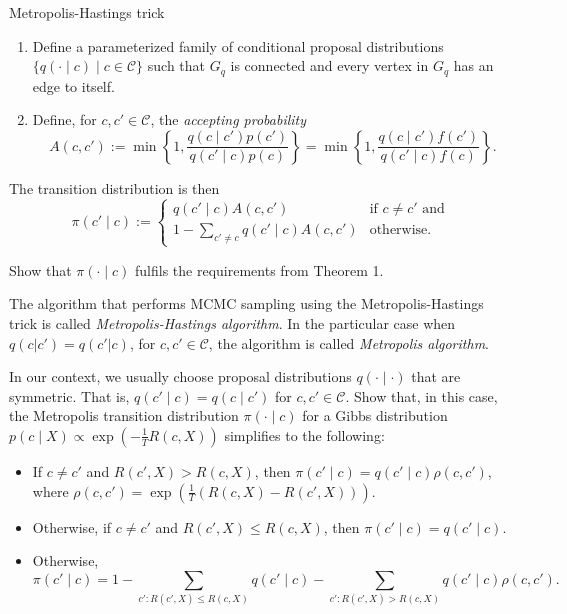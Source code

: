 \begin{definition}{Metropolis-Hastings trick}
\begin{enumerate}
\item Define a parameterized family of conditional proposal distributions
$\{q(\cdot \mid c) \mid c \in \mathcal{C}\}$ such that $G_q$ is connected and every vertex in $G_q$
has an edge to itself.
\item Define, for $c, c' \in \mathcal{C}$, the \emph{accepting probability}
%
\begin{equation}
A(c, c') := \min\left\{1, \frac{q(c \mid c')p(c')}{q(c' \mid c)p(c)}\right\} = \min\left\{1, \frac{q(c \mid c')f(c')}{q(c' \mid c)f(c)}\right\}.
\end{equation}
%
\end{enumerate}
%
The transition distribution is then
%
\begin{equation}
\pi(c' \mid c) := \begin{cases}
q(c' \mid c)A(c, c') & \text{if $c \neq c'$ and}\\
1 - \sum_{c' \neq c}q(c' \mid c)A(c, c') & \text{otherwise}.
\end{cases}
\end{equation}
%
\end{definition}

\begin{exercise}
Show that $\pi(\cdot \mid c)$ fulfils the requirements from Theorem 1.
\end{exercise}

\begin{definition}
The algorithm that performs MCMC sampling using the Metropolis-Hastings trick is called \emph{Metropolis-Hastings algorithm}. In the particular case when $q(c | c') = q(c' | c)$, for $c, c' \in \mathcal{C}$, the algorithm is called \emph{Metropolis algorithm}.
\end{definition}

\begin{exercise}
In our context, we usually choose proposal distributions $q(\cdot \mid \cdot)$
that are symmetric. That is, $q(c' \mid c) = q(c \mid c')$ for $c, c' \in \mathcal{C}$. Show that,
in this case, the Metropolis transition distribution $\pi(\cdot \mid c)$ for a
Gibbs distribution $p(c \mid X) \propto \exp\left(-\frac{1}{T}R(c, X)\right)$ simplifies to the following:

\begin{itemize}
\item If $c \neq c'$ and $R(c', X) > R(c, X)$, then $\pi(c' \mid c) = q(c' \mid c)\rho(c, c')$, where $\rho(c, c') = \exp\left(\frac{1}{T}\left(R(c, X) - R(c', X)\right)\right)$.
\item Otherwise, if $c \neq c'$ and $R(c', X) \leq R(c, X)$, then $\pi(c' \mid c) = q(c' \mid c)$.
\item Otherwise,
%
\begin{equation}
\pi(c' \mid c) = 1 - \sum_{c' : R(c', X) \leq R(c, X)}q(c' \mid c) - \sum_{c': R(c', X) > R(c, X)}q(c' \mid c)\rho(c, c').
\end{equation}
%
\end{itemize}
\end{exercise}

